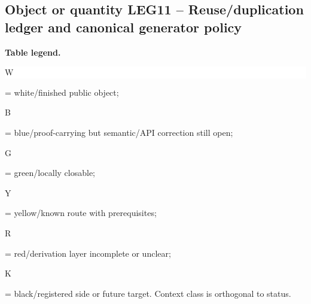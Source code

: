 \subsection*{Object or quantity LEG11 -- Reuse/\allowbreak{}duplication ledger and canonical generator policy}
\hypertarget{objproof:LEG11}{}
\par\smallskip\noindent\begin{minipage}{0.99\linewidth}\footnotesize\raggedright\textbf{Table legend.} \colorbox{white}{\strut W} = white/finished public object; \colorbox{cyan!20}{\strut B} = blue/proof-carrying but semantic/API correction still open; \colorbox{green!18}{\strut G} = green/locally closable; \colorbox{yellow!25}{\strut Y} = yellow/known route with prerequisites; \colorbox{red!20}{\strut R} = red/derivation layer incomplete or unclear; \colorbox{black!18}{\strut K} = black/registered side or future target. Context class is orthogonal to status.\end{minipage}\par\vspace{0.25em}

